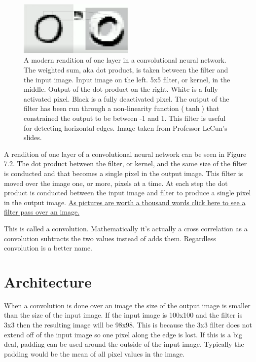\begin{figure}[ht]
  \centering    
      \includegraphics[width=0.5\textwidth]{figs/ConvnetArch.png}
          \caption{
            A modern rendition of one layer in a convolutional neural network.
            The weighted sum, aka dot product, is taken between the filter and the input image.
            Input image on the left.
            5x5 filter, or kernel, in the middle.
            Output of the dot product on the right.
            White is a fully activated pixel.
            Black is a fully deactivated pixel.
            The output of the filter has been run through a non-linearity function ($\tanh$) that constrained the output to be between -1 and 1.
            This filter is useful for detecting horizontal edges.
            Image taken from Professor LeCun's slides.
          }
\end{figure}

A rendition of one layer of a convolutional neural network can be seen in Figure 7.2.
The dot product between the filter, or kernel, and the same size of the filter is conducted and that becomes a single pixel in the output image.
This filter is moved over the image one, or more, pixels at a time.
At each step the dot product is conducted between the input image and filter to produce a single pixel in the output image.
\href{https://cdn-images-1.medium.com/max/1600/1*ZCjPUFrB6eHPRi4eyP6aaA.gif}{As pictures are worth a thousand words click here to see a filter pass over an image.}

This is called a convolution.
Mathematically it's actually a cross correlation as a convolution subtracts the two values instead of adds them.
Regardless convolution is a better name.

\section{Architecture}

When a convolution is done over an image the size of the output image is smaller than the size of the input image.
If the input image is 100x100 and the filter is 3x3 then the resulting image will be 98x98.
This is because the 3x3 filter does not extend off of the input image so one pixel along the edge is lost.
If this is a big deal, padding can be used around the outside of the input image.
Typically the padding would be the mean of all pixel values in the image.

